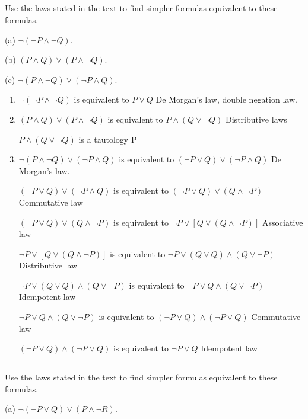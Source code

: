 \documentclass{article}
\begin{document}
\subsection{}
Use the laws stated in the text to find simpler formulas equivalent to
these formulas. 

(a) $\neg(\neg P \land \neg Q)$.

(b) $(P \land Q) \lor (P \land \neg Q)$.

(c) $\neg (P \land \neg Q) \lor (\neg P \land Q)$.

\begin{enumerate}[label=(\alph*)]
    \item 
    $\neg (\neg P \land \neg Q)$ is equivalent to $P \lor Q$ De Morgan's law, double negation law.
    \item
    $(P \land Q) \lor (P \land \neg Q)$ is equivalent to $P \land ( Q \lor \neg Q)$ Distributive laws
    
    $P \land ( Q \lor \neg Q)$ is a tautology
    P 
    \item 
    $\neg (P \land \neg Q) \lor (\neg P \land Q)$ is equivalent to $(\neg P \lor Q) \lor (\neg P \land Q)$ De Morgan's law.
    
    $(\neg P \lor Q) \lor (\neg P \land Q)$ is equivalent to $(\neg P \lor Q) \lor (Q \land \neg P)$ Commutative law
    
    $(\neg P \lor Q) \lor (Q \land \neg P)$ is equivalent to $\neg P \lor [Q \lor (Q \land \neg P)]$ Associative law
    
    $\neg P \lor [Q \lor (Q \land \neg P)]$ is equivalent to $\neg P \lor (Q \lor Q) \land (Q \lor \neg P)$ Distributive law
    
    $\neg P \lor (Q \lor Q) \land (Q \lor \neg P)$ is equivalent to $\neg P \lor Q \land (Q \lor  \neg P)$ Idempotent law
    
    $\neg P \lor Q \land (Q \lor  \neg P)$ is equivalent to $(\neg P \lor Q) \land (\neg P \lor Q)$ Commutative law
    
    $(\neg P \lor Q) \land (\neg P \lor Q)$ is equivalent to $\neg P \lor Q$ Idempotent law
\end{enumerate}
\subsection{}
Use the laws stated in the text to find simpler formulas equivalent to
these formulas.

(a) $\neg(\neg P \lor Q) \lor (P \land \neg R)$.
\end{document}
